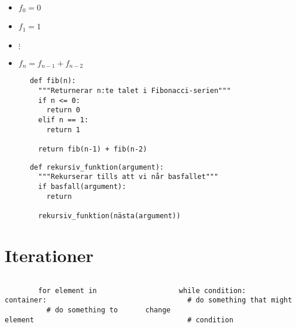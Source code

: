 \begin{frame}[fragile]
  \begin{definition}
    \begin{itemize}
      \item \(f_0 = 0\)
      \item \(f_1 = 1\)
      \item \(\vdots\)
      \item \(f_n = f_{n-1} + f_{n-2}\)
    \end{itemize}
  \end{definition}

  \begin{example}[Fibonacci]
    \begin{verbatim}
      def fib(n):
        """Returnerar n:te talet i Fibonacci-serien"""
        if n <= 0:
          return 0
        elif n == 1:
          return 1

        return fib(n-1) + fib(n-2)
    \end{verbatim}
  \end{example}
\end{frame}

\begin{frame}[fragile]
  \begin{definition}[Rekursion]
    \begin{verbatim}
      def rekursiv_funktion(argument):
        """Rekurserar tills att vi når basfallet"""
        if basfall(argument):
          return

        rekursiv_funktion(nästa(argument))
    \end{verbatim}
  \end{definition}
\end{frame}



\section{Iterationer}

\begin{frame}[fragile]
  \begin{columns}[t]
    \begin{column}{0.45\columnwidth}
      \begin{verbatim}
        for element in container:
          # do something to element
      \end{verbatim}
    \end{column}
    \begin{column}{0.55\columnwidth}
      \begin{verbatim}
        while condition:
          # do something that might change
          # condition
      \end{verbatim}
    \end{column}
  \end{columns}
\end{frame}

